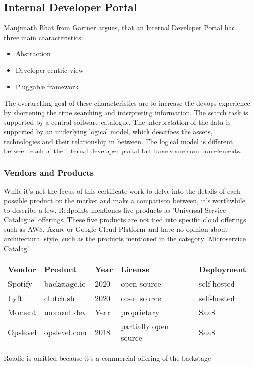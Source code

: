 \documentclass[a4paper,12pt]{article}
\begin{document}
    \subsection{Internal Developer Portal}
    Manjunath Bhat from Gartner argues, that an Internal Developer Portal has three main characteristics\parencite{gartner}:
    \begin{itemize}
        \item Abstraction
        \item Developer-centric view
        \item Pluggable framework
    \end{itemize}
    The overarching goal of these characteristics are to increase the devops experience by shortening the time searching
    and interpreting information.
    The search task is supported by a central software catalogue.
    The interpretation of the data is supported by an underlying logical model, which describes the assets, technologies
    and their relationship in between.
    The logical model is different between each of the internal developer portal but have some common elements.

    \subsubsection{Vendors and Products}
    While it's not the focus of this certificate work to delve into the details of each possible product on the market
    and make a comparison between, it's worthwhile to describe a few.
    Redpoints mentiones five products as 'Universal Service Catalogue' offerings\cite{devportalsprimer}.
    These five products are not tied into specific cloud offerings such as AWS, Azure or Google Cloud Platform and have
    no opinion about architectural style, such as the products mentioned in the category 'Microservice Catalog'.
    \begin{center}
        \begin{tabular}{ | l | l | l | l | l | }
            \hline
            Vendor   & Product      & Year & License               & Deployment  \\ \hline
            Spotify  & backstage.io & 2020 & open source           & self-hosted \\ \hline
            Lyft     & clutch.sh    & 2020 & open source           & self-hosted \\ \hline
            Moment   & moment.dev   & Year & proprietary           & SaaS        \\ \hline
            Opslevel & opslevel.com & 2018 & partially open source & SaaS        \\ \hline
        \end{tabular}
    \end{center}
    Roadie is omitted because it's a commercial offering of the backstage
\end{document}
